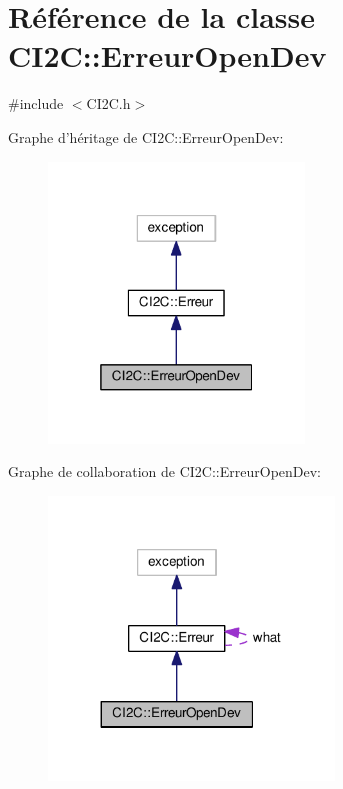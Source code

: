 \hypertarget{class_c_i2_c_1_1_erreur_open_dev}{\section{Référence de la classe C\+I2\+C\+:\+:Erreur\+Open\+Dev}
\label{class_c_i2_c_1_1_erreur_open_dev}
}


{\ttfamily \#include $<$C\+I2\+C.\+h$>$}



Graphe d'héritage de C\+I2\+C\+:\+:Erreur\+Open\+Dev\+:
\nopagebreak
\begin{figure}[H]
\begin{center}
\leavevmode
\includegraphics[width=193pt]{class_c_i2_c_1_1_erreur_open_dev__inherit__graph}
\end{center}
\end{figure}


Graphe de collaboration de C\+I2\+C\+:\+:Erreur\+Open\+Dev\+:
\nopagebreak
\begin{figure}[H]
\begin{center}
\leavevmode
\includegraphics[width=215pt]{class_c_i2_c_1_1_erreur_open_dev__coll__graph}
\end{center}
\end{figure}
